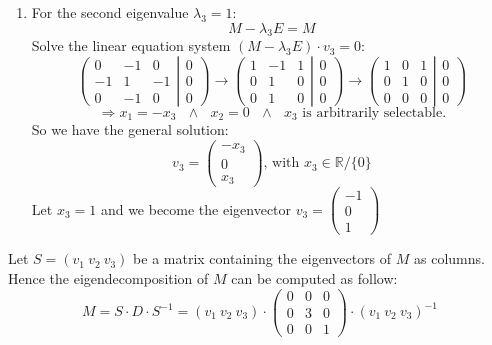 \documentclass[a4paper]{article}
\begin{document}
\begin{enumerate}
                    \item For the second eigenvalue $\lambda_3 = 1$:\\
                            $$M - \lambda_3 E = M$$
                        Solve the linear equation system $(M - \lambda_3E) \cdot v_3 = 0$:
                            $$\left ( \begin{array}{ccc} 0 & -1 & 0 \\ -1 & 1 & -1 \\ 0 & -1 & 0 \end{array} \right | \left. \begin{array}{c} 0 \\ 0 \\ 0 \end{array}\right)
                            \rightarrow \left ( \begin{array}{ccc} 1 & -1 & 1 \\ 0 & 1 & 0 \\ 0 & 1 & 0 \end{array} \right | \left. \begin{array}{c} 0 \\ 0 \\ 0 \end{array}\right)
                            \rightarrow \left ( \begin{array}{ccc} 1 & 0 & 1 \\ 0 & 1 & 0 \\ 0 & 0 & 0 \end{array} \right | \left. \begin{array}{c} 0 \\ 0 \\ 0 \end{array}\right)$$
                            $$\Rightarrow x_1 = -x_3\ \ \  \wedge\ \ \  x_2 = 0\ \ \  \wedge\ \ \  x_3 \text{ is arbitrarily selectable.}$$
                        So we have the general solution:
                            $$v_3 = \left( \begin{matrix} -x_3 \\ 0 \\ x_3 \end{matrix} \right) \text{, with } x_3 \in \mathbb{R}/\{0\}$$
                        Let $x_3 = 1$ and we become the eigenvector $v_3 = \left( \begin{matrix} -1 \\ 0 \\ 1 \end{matrix} \right)$
                \end{enumerate}
                Let $S = (v_1\ v_2\ v_3)$ be a matrix containing the eigenvectors of $M$ as columns.\\
                Hence the eigendecomposition of $M$ can be computed as follow:
                $$M = S \cdot D \cdot S^{-1} = (v_1\ v_2\ v_3) \cdot 
                \left( \begin{matrix} 0 & 0 & 0 \\ 0 & 3 & 0 \\ 0 & 0 & 1 \end{matrix} \right) \cdot (v_1\ v_2\ v_3)^{-1}$$
        
    
\end{document}
